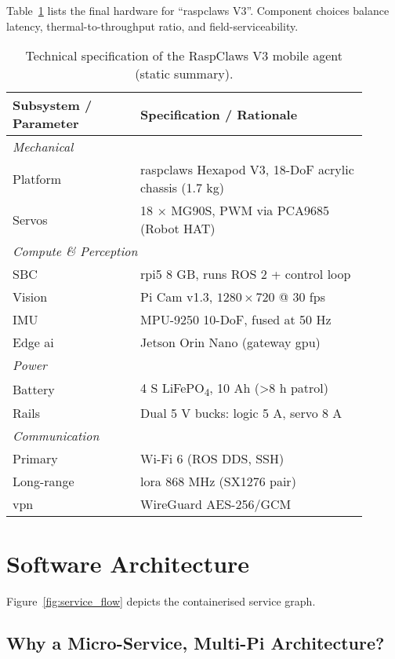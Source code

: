 Table~\ref{tab:raspclaws-spec} lists the final hardware for “\gls{raspclaws} V3”.
Component choices balance latency,
thermal-to-throughput ratio, and field-serviceability.

\begin{table}[ht]
\centering
\footnotesize
\caption{Technical specification of the RaspClaws V3 mobile agent (static summary).}
\label{tab:raspclaws-spec}
\begin{tabular}{@{}p{0.32\linewidth} p{0.58\linewidth}@{}}
\toprule
\textbf{Subsystem / Parameter} & \textbf{Specification / Rationale}\\\midrule
\multicolumn{2}{l}{\emph{Mechanical}}\\
Platform & \gls{raspclaws} Hexapod V3, 18-DoF acrylic chassis (1.7 kg) \\
Servos   & 18 × MG90S, PWM via PCA9685 (Robot HAT)\\[2pt]
\multicolumn{2}{l}{\emph{Compute \& Perception}}\\
SBC      & \gls{rpi5} 8 GB, runs ROS 2 + control loop\\
Vision   & Pi Cam v1.3, $1280\times720$ @ 30 fps\\
IMU      & MPU-9250 10-DoF, fused at 50 Hz\\
Edge \gls{ai} & Jetson Orin Nano (gateway \gls{gpu})\\[2pt]
\multicolumn{2}{l}{\emph{Power}}\\
Battery  & 4 S LiFePO\textsubscript{4}, 10 Ah (>8 h patrol)\\
Rails    & Dual 5 V bucks: logic 5 A, servo 8 A\\[2pt]
\multicolumn{2}{l}{\emph{Communication}}\\
Primary  & Wi-Fi 6 (ROS DDS, SSH)\\
Long-range & \gls{lora} 868 MHz (SX1276 pair) \\
\gls{vpn} & WireGuard AES-256/GCM \\
\bottomrule
\end{tabular}
\end{table}

\section{Software Architecture}
\label{sec:impl:software}

Figure~\ref{fig:service_flow} depicts the containerised service graph.

\subsection{Why a Micro-Service, Multi-Pi Architecture?}\label{subsec:why-a-micro-service-multi-pi-architecture?}

